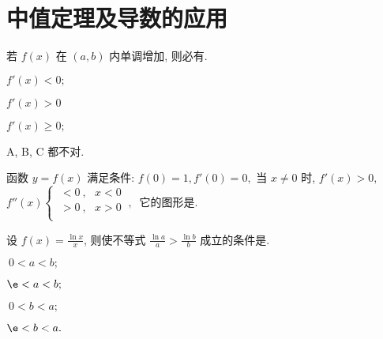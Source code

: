 \chapter{中值定理及导数的应用}


\begin{problem}
若 $f(x)$ 在 $(a,b)$ 内单调增加, 则必有.
\begin{abcd} 	
	\item $f'\left( x \right) < 0;$
	
	\item $f'\left( x \right) > 0$
	
	\item $f'\left( x \right) \geq 0;$
	
	\item A, B, C 都不对.
\end{abcd}

\end{problem}

\begin{problem}
函数 $y = f\left( x \right)$ 满足条件:
$f\left( 0 \right) = 1,f'\left( 0 \right) = 0,$ 当 $x \neq 0$ 时,
$f'\left( x \right) > 0,$ $f''\left( x \right)\left\{ \begin{matrix}
\ < 0\ ,\ \ \ x < 0 \\
\ > 0\ ,\ \ \ x > 0 \\
\end{matrix}\ , \right.\ $ 它的图形是.



\end{problem}
\begin{problem}
设 $\displaystyle f\left( x \right) = \frac{\ln x}{x}$, 则使不等式
$\displaystyle \frac{\ln a}{a} > \frac{\ln b}{b}$ 成立的条件是.

\begin{abcd} 
	
	\item $\ 0 < a < b;$
	
	\item $\e < a < b;$
	
	\item $\ 0 < b < a;$
	
	\item $\e < b < a.$

\end{abcd}

\end{problem}

